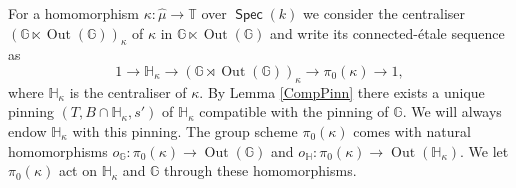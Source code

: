 \documentclass{article}
\DeclareMathOperator{\inn}{int}
\def\isoto{\stackrel{\sim}{\longrightarrow}}
\DeclareMathOperator{\Spec}{\mathsf{Spec}}
\newcommand{\BG}{{\mathbb{G}}}
\newcommand{\BH}{{\mathbb{H}}}
\newcommand{\BT}{{\mathbb{T}}}
\DeclareMathOperator{\Out}{Out}
\theoremstyle{definition}
\theoremstyle{plain}
\begin{document}

For a homomorphism $\kappa\colon \hat \mu \to \BT$ over $\Spec(k)$ we consider the centraliser $(\BG \ltimes \Out(\BG))_\kappa$ of $\kappa$ in $\BG \ltimes \Out(\BG)$ and write its connected-\'etale sequence as
\begin{equation*}
  1 \to \BH_\kappa \to (\BG \rtimes \Out(\BG))_\kappa \to \pi_0(\kappa) \to 1,
\end{equation*}
where $\BH_\kappa$ is the centraliser of $\kappa$. By Lemma \ref{CompPinn} there exists a unique pinning $(T,B\cap \BH_\kappa,s')$ of $\BH_\kappa$ compatible with the pinning of $\BG$. We will always endow $\BH_\kappa$ with this pinning. The group scheme $\pi_0(\kappa)$ comes with natural homomorphisms $o_\BG\colon \pi_0(\kappa)\to \Out(\BG)$ and $o_\BH\colon \pi_0(\kappa) \to \Out(\BH_\kappa)$. We let $\pi_0(\kappa)$ act on $\BH_\kappa$ and $\BG$ through these homomorphisms.

\end{document}
